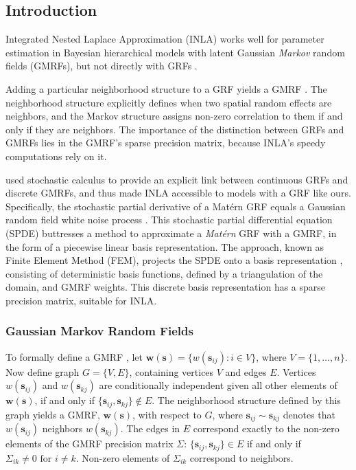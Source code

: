 \subsection{Introduction} %

Integrated Nested Laplace Approximation (INLA) works well for parameter estimation in Bayesian hierarchical models with latent Gaussian {\it Markov} random fields (GMRFs), but not directly with GRFs \citep{Rue2007}.

Adding a particular neighborhood structure to a GRF yields a GMRF \citep{Rue2007}. The neighborhood structure explicitly defines when two spatial random effects are neighbors, and the Markov structure assigns non-zero correlation to them if and only if they are neighbors. The importance of the distinction between GRFs and GMRFs lies in the GMRF's sparse precision matrix, because INLA's speedy computations rely on it.

\cite{Lindgren2011} used stochastic calculus \citep{Mao2007} to provide an explicit link between continuous GRFs and discrete GMRFs, and thus made INLA accessible to models with a GRF like ours. Specifically, the stochastic partial derivative of a Mat\'ern GRF equals a Gaussian random field white noise process \citep{Lindgren2011}. This stochastic partial differential equation (SPDE) buttresses a method to approximate a {\it Mat\'ern} GRF with a GMRF, in the form of a piecewise linear basis representation. The approach, known as Finite Element Method (FEM), projects the SPDE onto a basis representation \citep{Dhatt2012}, consisting of deterministic basis functions, defined by a triangulation of the domain, and GMRF weights. This discrete basis representation has a sparse precision matrix, suitable for INLA. 

\subsubsection{Gaussian Markov Random Fields} %

To formally define a GMRF , let $\pmb{w}(\pmb{s}) = \{w(\pmb{s}_{ij}):i \in V\}$, where $V = \{1,\dots,n\}$. Now define graph $G = \{ V, E \}$, containing vertices $V$ and edges $E$. Vertices $w(\pmb{s}_{ij})$ and $w(\pmb{s}_{kj})$ are conditionally independent given all other elements of $\pmb{w}(\pmb{s})$, if and only if $\{\pmb{s}_{ij}, \pmb{s}_{kj}\} \notin E$. The neighborhood structure defined by this graph yields a GMRF, $\pmb{w}(\pmb{s})$, with respect to $G$, where $\pmb{s}_{ij} \sim \pmb{s}_{kj}$ denotes that $w(\pmb{s}_{ij})$ neighbors $w(\pmb{s}_{kj})$. The edges in $E$ correspond exactly to the non-zero elements of the GMRF precision matrix $\Sigma$: $\{\pmb{s}_{ij}, \pmb{s}_{kj}\} \in E$ if and only if $\Sigma_{ik} \neq 0 \text{ for } i \neq k$. Non-zero elements of $\Sigma_{ik}$ correspond to neighbors.

